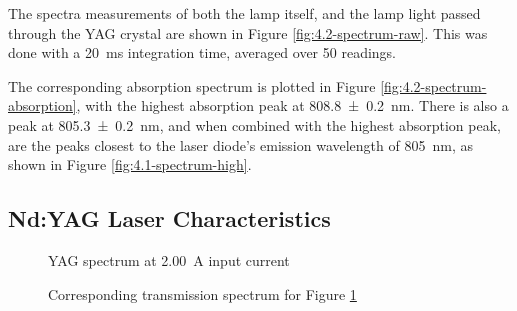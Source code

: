 \documentclass[a4paper]{scrartcl}
\begin{document}
The spectra measurements of both the lamp itself, and the lamp light passed through the YAG crystal are shown in Figure \ref{fig:4.2-spectrum-raw}. This was done with a \SI{20}{\milli\second} integration time, averaged over 50 readings.

The corresponding absorption spectrum is plotted in Figure \ref{fig:4.2-spectrum-absorption}, with the highest absorption peak at \SI{808.8 \pm 0.2}{\nano\metre}. There is also a peak at \SI{805.3 \pm 0.2}{\nano\metre}, and when combined with the highest absorption peak, are the peaks closest to the laser diode's emission wavelength of \SI{805}{\nano\metre}, as shown in Figure \ref{fig:4.1-spectrum-high}.

\subsection{Nd:YAG Laser Characteristics}
\begin{figure}
    \centering
    \caption{YAG spectrum at \SI{2.00}{\ampere} input current}
    \label{fig:4.4-spectra}
\end{figure}
\begin{figure}
    \centering
    \caption{Corresponding transmission spectrum for Figure \ref{fig:4.4-spectra}}
    \label{fig:4.4-transmission}
\end{figure}
\end{document}
